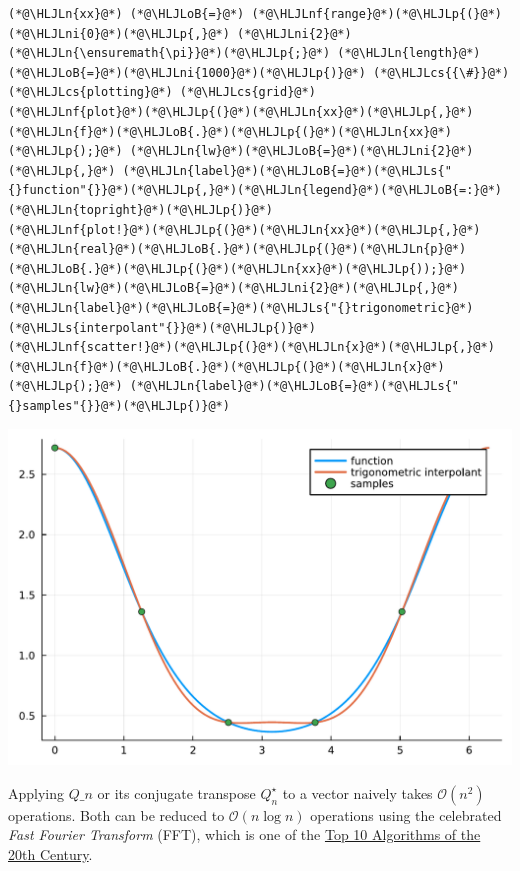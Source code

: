 \documentclass[12pt,landscape]{article}
\newcommand{\HLJLn}[1]{#1}
\newcommand{\HLJLnf}[1]{\textcolor[RGB]{66,102,213}{#1}}
\newcommand{\HLJLs}[1]{\textcolor[RGB]{201,61,57}{#1}}
\newcommand{\HLJLni}[1]{\textcolor[RGB]{59,151,46}{#1}}
\newcommand{\HLJLoB}[1]{\textcolor[RGB]{102,102,102}{\textbf{#1}}}
\newcommand{\HLJLp}[1]{#1}
\newcommand{\HLJLcs}[1]{\textcolor[RGB]{153,153,119}{\textit{#1}}}
\begin{document}
{\begin{lstlisting}
(*@\HLJLn{xx}@*) (*@\HLJLoB{=}@*) (*@\HLJLnf{range}@*)(*@\HLJLp{(}@*)(*@\HLJLni{0}@*)(*@\HLJLp{,}@*) (*@\HLJLni{2}@*)(*@\HLJLn{\ensuremath{\pi}}@*)(*@\HLJLp{;}@*) (*@\HLJLn{length}@*)(*@\HLJLoB{=}@*)(*@\HLJLni{1000}@*)(*@\HLJLp{)}@*) (*@\HLJLcs{{\#}}@*) (*@\HLJLcs{plotting}@*) (*@\HLJLcs{grid}@*)
(*@\HLJLnf{plot}@*)(*@\HLJLp{(}@*)(*@\HLJLn{xx}@*)(*@\HLJLp{,}@*) (*@\HLJLn{f}@*)(*@\HLJLoB{.}@*)(*@\HLJLp{(}@*)(*@\HLJLn{xx}@*)(*@\HLJLp{);}@*) (*@\HLJLn{lw}@*)(*@\HLJLoB{=}@*)(*@\HLJLni{2}@*)(*@\HLJLp{,}@*) (*@\HLJLn{label}@*)(*@\HLJLoB{=}@*)(*@\HLJLs{"{}function"{}}@*)(*@\HLJLp{,}@*)(*@\HLJLn{legend}@*)(*@\HLJLoB{=:}@*)(*@\HLJLn{topright}@*)(*@\HLJLp{)}@*)
(*@\HLJLnf{plot!}@*)(*@\HLJLp{(}@*)(*@\HLJLn{xx}@*)(*@\HLJLp{,}@*) (*@\HLJLn{real}@*)(*@\HLJLoB{.}@*)(*@\HLJLp{(}@*)(*@\HLJLn{p}@*)(*@\HLJLoB{.}@*)(*@\HLJLp{(}@*)(*@\HLJLn{xx}@*)(*@\HLJLp{));}@*) (*@\HLJLn{lw}@*)(*@\HLJLoB{=}@*)(*@\HLJLni{2}@*)(*@\HLJLp{,}@*) (*@\HLJLn{label}@*)(*@\HLJLoB{=}@*)(*@\HLJLs{"{}trigonometric}@*) (*@\HLJLs{interpolant"{}}@*)(*@\HLJLp{)}@*)
(*@\HLJLnf{scatter!}@*)(*@\HLJLp{(}@*)(*@\HLJLn{x}@*)(*@\HLJLp{,}@*) (*@\HLJLn{f}@*)(*@\HLJLoB{.}@*)(*@\HLJLp{(}@*)(*@\HLJLn{x}@*)(*@\HLJLp{);}@*) (*@\HLJLn{label}@*)(*@\HLJLoB{=}@*)(*@\HLJLs{"{}samples"{}}@*)(*@\HLJLp{)}@*)
\end{lstlisting}

\includegraphics[width=\linewidth]{jl_qsW2Qg/Fourier_5_1.pdf}

Applying $Q\ensuremath{\_n}$ or its conjugate transpose $Q_n^\ensuremath{\star}$ to a vector naively takes $\mathcal{O}(n^2)$ operations. Both can be reduced to $\mathcal{O}(n \log n)$ operations using the celebrated \emph{Fast Fourier Transform} (FFT), which is one of the \href{https://pi.math.cornell.edu/~web6140/}{Top 10 Algorithms of the 20th Century}.


}
\end{document}
